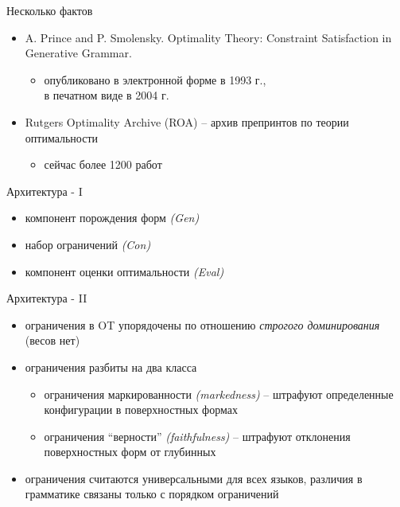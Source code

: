 \documentclass{beamer}
\begin{document}
\begin{frame}{Несколько фактов}
\begin{itemize}
	\item A. Prince and P. Smolensky. Optimality Theory: Constraint Satisfaction in Generative Grammar.
		\medskip
		\begin{itemize}
			\item опубликовано в электронной форме в 1993 г.,\\в печатном виде в 2004 г.
		\end{itemize}
	\medskip
	\item Rutgers Optimality Archive (ROA) -- архив препринтов по теории оптимальности
		\medskip
		\begin{itemize}
			\item сейчас более 1200 работ
		\end{itemize}
\end{itemize}
\end{frame}


\begin{frame}{Архитектура - I}
\begin{itemize}
	\item компонент порождения форм \textit{(Gen)}
	\medskip
	\item набор ограничений \textit{(Con)}
	\medskip
	\item компонент оценки оптимальности \textit{(Eval)}
\end{itemize}
\end{frame}

\begin{frame}{Архитектура - II}
\begin{itemize}
	\item ограничения в OT упорядочены по отношению \textit{строгого доминирования} (весов нет)
	\medskip
	\item ограничения разбиты на два класса
		\medskip
		\begin{itemize}
			\item ограничения маркированности \textit{(markedness)} -- штрафуют определенные конфигурации в поверхностных формах
			\medskip
			\item ограничения ``верности'' \textit{(faithfulness)} -- штрафуют отклонения поверхностных форм от глубинных
		\end{itemize}
	\medskip
	\item ограничения считаются универсальными для всех языков, различия в грамматике связаны только с порядком ограничений
\end{itemize}
\end{frame}
\end{document}
